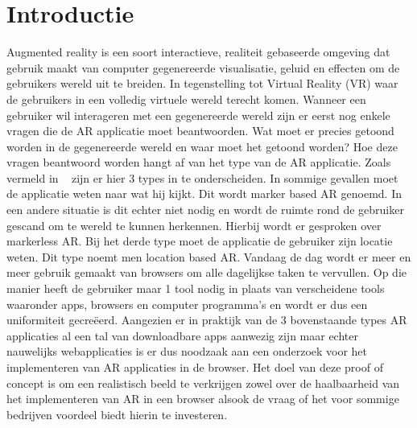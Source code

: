 
\section{Introductie} %
\label{sec:introductie}

Augmented reality is een soort interactieve, realiteit gebaseerde omgeving dat gebruik maakt van computer gegenereerde visualisatie, geluid en effecten om de gebruikers wereld uit te breiden. In tegenstelling tot Virtual Reality (VR) waar de gebruikers in een volledig virtuele wereld terecht komen. 
Wanneer een gebruiker wil interageren met een gegenereerde wereld zijn er eerst nog enkele vragen die de AR applicatie moet beantwoorden. Wat moet er precies getoond worden in de gegenereerde wereld en waar moet het getoond worden? Hoe deze vragen beantwoord worden hangt af van het type van de AR applicatie. Zoals vermeld in  ~\textcite{Paladini2018} zijn er hier 3 types in te onderscheiden. In sommige gevallen moet de applicatie weten naar wat hij kijkt. Dit wordt marker based AR genoemd. In een andere situatie is dit echter niet nodig en wordt de ruimte rond de gebruiker gescand om te wereld te kunnen herkennen. Hierbij wordt er gesproken over markerless AR. Bij het derde type moet de applicatie de gebruiker zijn locatie weten. Dit type noemt men location based AR.  
Vandaag de dag wordt er meer en meer gebruik gemaakt van browsers om alle dagelijkse taken te vervullen. Op die manier heeft de gebruiker maar 1 tool nodig in plaats van verscheidene tools waaronder apps, browsers en computer programma’s en wordt er dus een uniformiteit gecreëerd. Aangezien er in praktijk van de 3 bovenstaande types AR applicaties al een tal van downloadbare apps aanwezig zijn maar echter nauwelijks webapplicaties is er dus noodzaak aan een onderzoek voor het implementeren van AR applicaties in de browser. Het doel van deze proof of concept is om een realistisch beeld te verkrijgen zowel over de haalbaarheid van het implementeren van AR in een browser alsook de vraag of het voor sommige bedrijven voordeel biedt hierin te investeren. 




